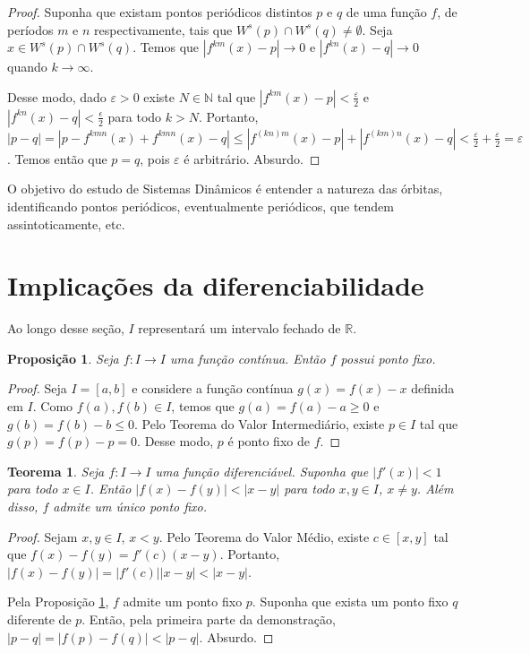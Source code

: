 \documentclass[a4paper, 12pt]{article}
\theoremstyle{definition}
\theoremstyle{plain}
\newtheorem{proposition}[definition]{Proposição}
\theoremstyle{plain}
\theoremstyle{plain}
\newtheorem{theorem}[definition]{Teorema}
\theoremstyle{remark}
\newcommand{\RR}{\mathbb{R}}
\newcommand{\NN}{\mathbb{N}}
\begin{document}
\begin{proof}
Suponha que existam pontos periódicos distintos $p$ e $q$ de uma função $f$, de períodos $m$ e $n$ respectivamente, tais que $W^s(p) \cap W^s(q) \neq \emptyset$. Seja $x \in W^s(p) \cap W^s(q)$. Temos que $|f^{km}(x) - p| \rightarrow 0$ e $|f^{kn}(x) - q| \rightarrow 0$ quando $k \rightarrow \infty$.

Desse modo, dado $\varepsilon > 0$ existe $N \in \NN$ tal que $|f^{km}(x) - p| < \frac{\varepsilon}{2}$ e $|f^{kn}(x) - q| < \frac{\epsilon}{2}$ para todo $k > N$. Portanto, $|p - q| = |p - f^{kmn}(x) + f^{kmn}(x) - q| \leq |f^{(kn)m}(x) - p| + |f^{(km)n}(x) - q| < \frac{\varepsilon}{2} + \frac{\varepsilon}{2} = \varepsilon$. Temos então que $p = q$, pois $\varepsilon$ é arbitrário. Absurdo.
\end{proof}

O objetivo do estudo de Sistemas Dinâmicos é entender a natureza das órbitas, identificando pontos periódicos, eventualmente periódicos, que tendem assintoticamente, etc.

\section{Implicações da diferenciabilidade}

Ao longo desse seção, $I$ representará um intervalo fechado de $\RR$.  

\begin{proposition}
\label{prop ponto fixo}
Seja $f: I \rightarrow I$ uma função contínua. Então $f$ possui ponto fixo.
\end{proposition}

\begin{proof}
Seja $I = [a, b]$ e considere a função contínua $g(x) = f(x) - x$ definida em $I$. Como $f(a), f(b) \in I$, temos que $g(a) = f(a) - a \geq 0$ e $g(b) = f(b) - b \leq 0$. Pelo Teorema do Valor Intermediário, existe $p \in I$ tal que $g(p) = f(p) -p = 0$. Desse modo, $p$ é ponto fixo de $f$.
\end{proof}

\begin{theorem}
\label{teo ponto fixo unico}
Seja $f:I \rightarrow I$ uma função diferenciável. Suponha que $|f'(x)|<1$ para todo $x \in I$. Então $|f(x) - f(y)| < |x - y|$ para todo $x, y \in I$, $x \neq y$. Além disso,  $f$ admite um único ponto fixo.
\end{theorem}

\begin{proof}
Sejam $x, y \in I$, $x < y$. Pelo Teorema do Valor Médio, existe $c \in [x, y]$ tal que $f(x) - f(y) = f'(c)(x - y)$. Portanto, $|f(x) - f(y)| = |f'(c)||x - y| < |x - y|$.

Pela Proposição \ref{prop ponto fixo}, $f$ admite um ponto fixo $p$. Suponha que exista um ponto fixo $q$ diferente de $p$. Então, pela primeira parte da demonstração, $|p - q| = |f(p) - f(q)| < |p - q|$. Absurdo.
\end{proof}
\end{document}
